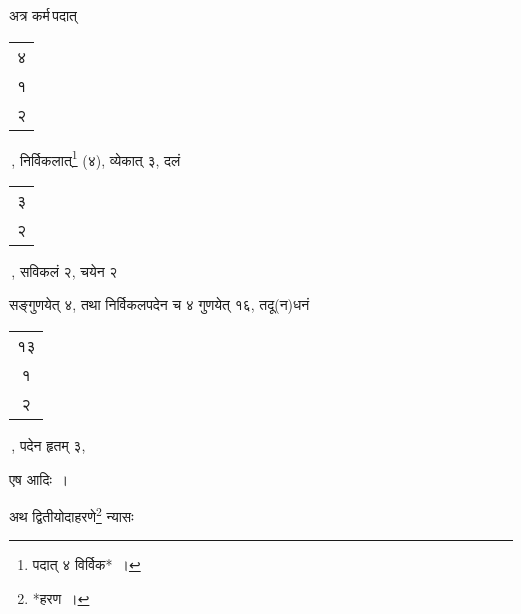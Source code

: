 \documentclass[10pt, openany]{book}
\begin{document}
{{{{{{{{अत्र कर्म\textendash \,पदात् \begin{tabular}{c|}४\\ १\\ २\\\hline \end{tabular}\,, निर्विकलात्\renewcommand{\thefootnote}{७}\footnote {पदात् ४ विर्विक*~।}  (४), व्येकात् ३, दलं \begin{tabular}{c|}३\\ २\\\hline
\end{tabular}\,, सविकलं २, चयेन २}
{सङ्गुणयेत् ४, तथा निर्विकलपदेन च ४ गुणयेत् १६, तदू(न)धनं \begin{tabular}{c|}१३\\ १\\ २\\\hline
\end{tabular}\,, पदेन हृतम् ३,}
{एष आदिः~।}
\vspace{3mm}

{अथ द्वितीयोदाहरणे\renewcommand{\thefootnote}{८}\footnote {*हरण~।}  न्यासः\textendash}
\vspace{2mm}

\vspace{2mm}

}}}}}}}
\end{document}
